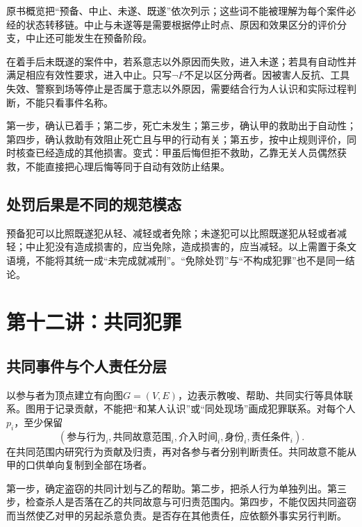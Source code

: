 原书概览把“预备、中止、未遂、既遂”依次列示；这些词不能被理解为每个案件必经的状态转移链。中止与未遂等是需要根据停止时点、原因和效果区分的评价分支，中止还可能发生在预备阶段。

在着手后未既遂的案件中，若系意志以外原因而失败，进入未遂；若具有自动性并满足相应有效性要求，进入中止。只写$\neg F$不足以区分两者。因被害人反抗、工具失效、警察到场等停止是否属于意志以外原因，需要结合行为人认识和实际过程判断，不能只看事件名称。

第一步，确认已着手；第二步，死亡未发生；第三步，确认甲的救助出于自动性；第四步，确认救助有效阻止死亡且与甲的行动有关；第五步，按中止规则评价，同时核查已经造成的其他损害。变式：甲虽后悔但拒不救助，乙靠无关人员偶然获救，不能直接把心理后悔等同于自动有效防止结果。

\subsection{处罚后果是不同的规范模态}
预备犯可以比照既遂犯从轻、减轻或者免除；未遂犯可以比照既遂犯从轻或者减轻；中止犯没有造成损害的，应当免除，造成损害的，应当减轻。以上需置于条文语境，不能将其统一成“未完成就减刑”。“免除处罚”与“不构成犯罪”也不是同一结论。


\section{第十二讲：共同犯罪}
\subsection{共同事件与个人责任分层}

以参与者为顶点建立有向图$G=(V,E)$，边表示教唆、帮助、共同实行等具体联系。图用于记录贡献，不能把“和某人认识”或“同处现场”画成犯罪联系。对每个人$p_i$，至少保留
\[
 (\text{参与行为}_i,\text{共同故意范围}_i,
 \text{介入时间}_i,\text{身份}_i,\text{责任条件}_i).
\]
在共同范围内研究行为贡献及归责，再对各参与者分别判断责任。共同故意不能从甲的口供单向复制到全部在场者。

第一步，确定盗窃的共同计划与乙的帮助。第二步，把杀人行为单独列出。第三步，检查杀人是否落在乙的共同故意与可归责范围内。第四步，不能仅因共同盗窃而当然使乙对甲的另起杀意负责。是否存在其他责任，应依额外事实另行判断。

